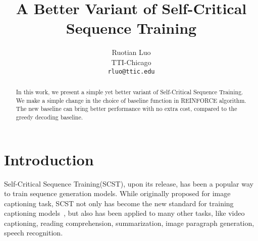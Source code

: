 \documentclass[11pt,a4paper]{article}
\title{A Better Variant of Self-Critical Sequence Training}
\author{Ruotian Luo \\
  TTI-Chicago \\
  \texttt{rluo@ttic.edu}}
\date{}
\begin{document}
\maketitle
\begin{abstract}
In this work, we present a simple yet better variant of Self-Critical Sequence Training. We make a simple change in the choice of baseline function in REINFORCE algorithm. The new baseline can bring better performance with no extra cost, compared to the greedy decoding baseline.
\end{abstract}

\section{Introduction}
Self-Critical Sequence Training(SCST), upon its release, has been a popular way to train sequence generation models. While originally proposed for image captioning task, SCST not only has become the new standard for training captioning models~\cite{yao2017boosting,dognin2019adversarial,luo2018discriminability,jiang2018recurrent,liu2018show,ling2017teaching,liu2018context,chen2019improving,yang2019auto,zhao2018multi}, but also has been applied to many other tasks, like video captioning\cite{li2018jointly,chen2018less,li2019end}, reading comprehension\cite{hu2017reinforced}, summarization\cite{celikyilmaz2018deep,paulus2017deep,wang2018reinforced,pasunuru2018multi}, image paragraph generation\cite{melas2018training}, speech recognition\cite{zhou2018improving}.
\end{document}
